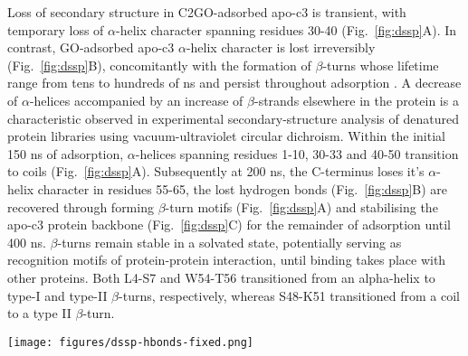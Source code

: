 Loss of secondary structure in C2GO-adsorbed apo-c3 is transient, with temporary loss of $\alpha$-helix character spanning residues 30-40 (Fig.~\ref{fig:dssp}A). In contrast, GO-adsorbed apo-c3 $\alpha$-helix character is lost irreversibly  (Fig.~\ref{fig:dssp}B), concomitantly with the formation of $\beta$-turns whose lifetime range from tens to hundreds of ns and persist throughout adsorption . A decrease of $\alpha$-helices accompanied by an increase of $\beta$-strands elsewhere in the protein is a characteristic observed in experimental secondary-structure analysis of denatured protein libraries using vacuum-ultraviolet circular dichroism.\cite{matsuo2007secondary} Within the initial 150 ns of adsorption, $\alpha$-helices spanning residues 1-10, 30-33 and 40-50 transition to coils (Fig.~\ref{fig:dssp}A). Subsequently at 200 ns, the C-terminus loses it's $\alpha$-helix character in residues 55-65, the lost hydrogen bonds (Fig.~\ref{fig:dssp}B) are recovered through forming $\beta$-turn motifs (Fig.~\ref{fig:dssp}A) and stabilising the apo-c3 protein backbone (Fig.~\ref{fig:dssp}C) for the remainder of adsorption until 400 ns. $\beta$-turns remain stable in a solvated state, potentially serving as recognition motifs of protein-protein interaction,\cite{tyndall2005over} until binding takes place with other proteins. Both L4-S7 and W54-T56 transitioned from an alpha-helix to type-I and type-II $\beta$-turns, respectively, whereas S48-K51 transitioned from a coil to a type II $\beta$-turn. 
\begin{figure*}
    \centering
    \texttt{[image: figures/dssp-hbonds-fixed.png]}
    \caption{Define Secondary Structure of Proteins (DSSP) algorithm applied to the MD trajectory of apo-c3 adsorption with GO and C2GO (A), the number of intramolecular hydrogen bonds per amino acid residue throughout adsorption (B) and illustration of $\beta$-turns induced in GO-adsorbed apo-c3 following denaturing (residues 4-S7, S48-K51 and W54-), pink and grey structures respectively correspond to the initial and final adsorption conformations (C).}
    \label{fig:dssp}
\end{figure*}
